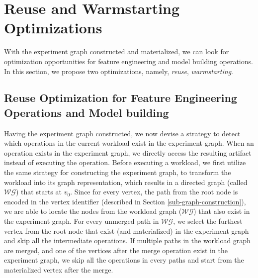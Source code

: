 \section{Reuse and Warmstarting Optimizations}\label{sec-reuse-and-warmstarting}
With the experiment graph constructed and materialized, we can look for optimization opportunities for feature engineering and model building operations.
In this section, we propose two optimizations, namely, \textit{reuse}, \textit{warmstarting}.

\subsection{Reuse Optimization for Feature Engineering Operations and Model building}
Having the experiment graph constructed, we now devise a strategy to detect which operations in the current workload exist in the experiment graph.
When an operation exists in the experiment graph, we directly access the resulting artifact instead of executing the operation.
Before executing a workload, we first utilize the same strategy for constructing the experiment graph, to transform the workload into its graph representation, which results in a directed graph (called $\mathcal{WG}$) that starts at $v_0$.
Since for every vertex, the path from the root node is encoded in the vertex identifier (described in Section \ref{sub-graph-construction}), we are able to locate the nodes from the workload graph ($\mathcal{WG}$) that also exist in the experiment graph.
For every unmerged path in $\mathcal{WG}$, we select the furthest vertex from the root node that exist (and materialized) in the experiment graph and skip all the intermediate operations.
If multiple paths in the workload graph are merged, and one of the vertices after the merge operation exist in the experiment graph, we skip all the operations in every paths and start from the materialized vertex after the merge. 

